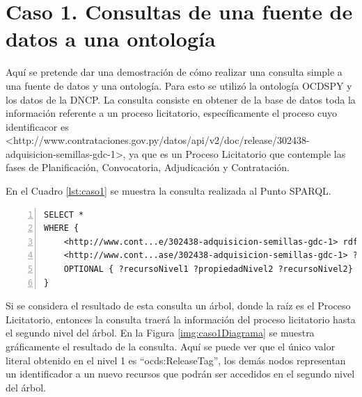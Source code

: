 \section{Caso 1. Consultas de una fuente de datos a una ontología}
\label{section:caso1}


Aquí se pretende dar una demostración de cómo realizar una consulta simple a una fuente de datos y una ontología. Para esto se utilizó la ontología OCDSPY y los datos de la DNCP. La consulta consiste en obtener de la base de datos toda la información referente a un proceso licitatorio, específicamente el proceso cuyo identificacor es <http://www.contrataciones.gov.py/datos/api/v2/doc/release/302438-adquisicion-semillas-gdc-1>, ya que es un Proceso Licitatorio que contemple las fases de Planificación, Convocatoria, Adjudicación y Contratación.

En el Cuadro \ref{lst:caso1} se muestra la consulta realizada al Punto SPARQL.

\noindent\begin{minipage}[t]{\textwidth}
\begin{lstlisting}[captionpos=b, caption={Triplas referentes al proceso licitatorio cuyo identificador es 302438}, label={lst:caso1},  numbers=left,  numberstyle=\tiny\color{mygray},frame=single]
SELECT *  
WHERE {    	
    <http://www.cont...e/302438-adquisicion-semillas-gdc-1> rdf:type ocds:Release .
    <http://www.cont...ase/302438-adquisicion-semillas-gdc-1> ?propiedadNivel1 ?recursoNivel1 .   
    OPTIONAL { ?recursoNivel1 ?propiedadNivel2 ?recursoNivel2}
}  
 \end{lstlisting}
\end{minipage}

 Si se considera el resultado de esta consulta un árbol, donde la raíz es el Proceso Licitatorio, entonces la consulta traerá la información del proceso licitatorio hasta el segundo nivel del árbol. En la Figura \ref{img:caso1Diagrama} se muestra gráficamente el resultado de la consulta. Aquí se puede ver que el único valor literal obtenido en el nivel 1 es “ocds:ReleaseTag”, los demás nodos representan un identificador a un nuevo recursos que podrán ser accedidos en el segundo nivel del árbol.
 
